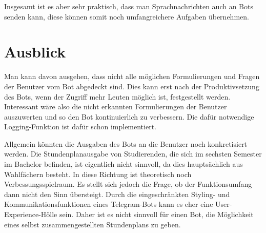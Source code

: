 Insgesamt ist es aber sehr praktisch, dass man Sprachnachrichten auch an Bots senden kann, diese können somit noch umfangreichere Aufgaben übernehmen. 

\section{Ausblick}
Man kann davon ausgehen, dass nicht alle möglichen Formulierungen und Fragen der Benutzer vom Bot abgedeckt sind. Dies kann erst nach der Produktivsetzung des Bots, wenn der Zugriff mehr Leuten möglich ist, festgestellt werden. Interessant wäre also die nicht erkannten Formulierungen der Benutzer auszuwerten und so den Bot kontinuierlich zu verbessern. Die dafür notwendige Logging-Funktion ist dafür schon implementiert.

Allgemein könnten die Ausgaben des Bots an die Benutzer noch konkretisiert werden. Die Stundenplanausgabe von Studierenden, die sich im sechsten Semester im Bachelor befinden, ist eigentlich nicht sinnvoll, da dies hauptsächlich aus Wahlfächern besteht. In diese Richtung ist theoretisch noch Verbessungsspielraum. 
Es stellt sich jedoch die Frage, ob der Funktionsumfang dann nicht den Sinn übersteigt. Durch die eingeschränkten Styling- und Kommunikationsfunktionen eines Telegram-Bots kann es eher eine User-Experience-Hölle sein. Daher ist es nicht sinnvoll für einen Bot, die Möglichkeit eines selbst zusammengestellten Stundenplans zu geben.

